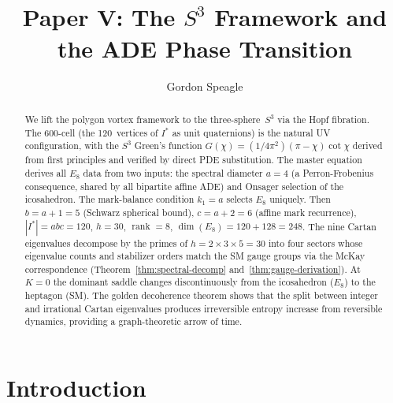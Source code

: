 









\title{\seriestitle\\[6pt]\large Paper V: The $S^3$ Framework and the ADE Phase Transition}
\author{Gordon Speagle}
\date{}


\maketitle

\begin{abstract}
We lift the polygon vortex framework to the three-sphere~$S^3$
via the Hopf fibration.
The 600-cell (the 120~vertices of $I^*$ as unit quaternions)
is the natural UV configuration, with the $S^3$ Green's function
$G(\chi) = (1/4\pi^2)(\pi - \chi)\cot\chi$ derived from first
principles and verified by direct PDE substitution.
The master equation derives all $E_8$ data from two inputs:
the spectral diameter $a = 4$ (a Perron-Frobenius consequence,
shared by all bipartite affine ADE) and Onsager selection of
the icosahedron.
The mark-balance condition $k_1 = a$ selects $E_8$ uniquely.
Then $b = a{+}1 = 5$ (Schwarz spherical bound),
$c = a{+}2 = 6$ (affine mark recurrence),
$|I^*| = abc = 120$, $h = 30$, $\operatorname{rank} = 8$,
$\dim(E_8) = 120 + 128 = 248$.
The nine Cartan eigenvalues decompose by the primes
of $h = 2 \times 3 \times 5 = 30$ into four sectors
whose eigenvalue counts and stabilizer orders
match the SM gauge groups via the McKay correspondence
(Theorem~\ref{thm:spectral-decomp}
and~\ref{thm:gauge-derivation}).
At $K = 0$ the dominant saddle changes discontinuously from
the icosahedron ($E_8$) to the heptagon (SM).
The golden decoherence theorem shows that the split between
integer and irrational Cartan eigenvalues produces irreversible
entropy increase from reversible dynamics, providing a
graph-theoretic arrow of time.
\end{abstract}

\tableofcontents

\section{Introduction}
\label{sec:intro}

